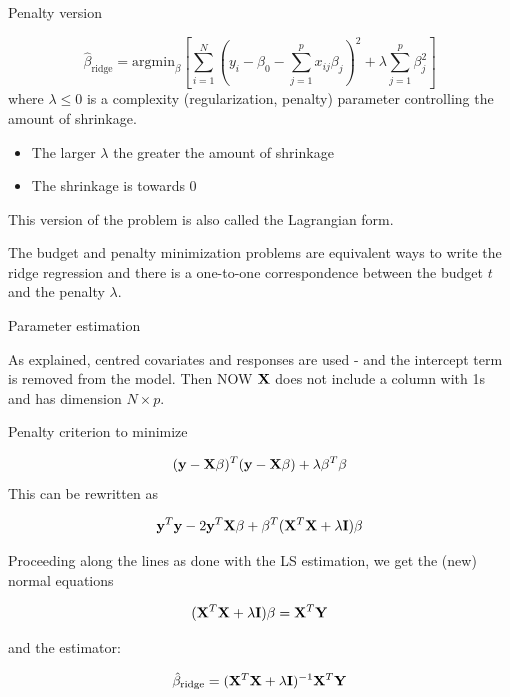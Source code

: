 \documentclass[
  ignorenonframetext,
]{beamer}
\providecommand{\tightlist}{%
  \setlength{\itemsep}{0pt}\setlength{\parskip}{0pt}}
\begin{document}
\begin{frame}

\begin{block}{Penalty version}

\[ \hat{\beta}_{\text{ridge}}= \text{argmin}_{\beta}[\sum_{i=1}^N (y_i-\beta_0-\sum_{j=1}^p x_{ij}\beta_j )^2 + \lambda \sum_{j=1}^p \beta_j^2]\]
where \(\lambda \le 0\) is a complexity (regularization, penalty)
parameter controlling the amount of shrinkage.

\begin{itemize}
\tightlist
\item
  The larger \(\lambda\) the greater the amount of shrinkage
\item
  The shrinkage is towards 0
\end{itemize}

This version of the problem is also called the Lagrangian form.

The budget and penalty minimization problems are equivalent ways to
write the ridge regression and there is a one-to-one correspondence
between the budget \(t\) and the penalty \(\lambda\).

\end{block}

\end{frame}

\begin{frame}

\begin{block}{Parameter estimation}

As explained, centred covariates and responses are used - and the
intercept term is removed from the model. Then NOW \({\bf X}\) does not
include a column with 1s and has dimension \(N \times p\).

Penalty criterion to minimize

\[ ({\bf y}-{\bf X}\beta)^T ({\bf y}-{\bf X}\beta)+ \lambda \beta^T \beta \]
This can be rewritten as

\[ {\bf y}^T{\bf y}-2{\bf y}^T{\bf X}\beta+\beta^T({\bf X}^T{\bf X}+\lambda {\bf I})\beta\]

\end{block}

\end{frame}

\begin{frame}

Proceeding along the lines as done with the LS estimation, we get the
(new) normal equations

\[ ({\bf X}^T{\bf X}+\lambda {\bf I})\beta= {\bf X}^T {\bf Y}\]

and the estimator:

\[ \hat{\beta}_{\text{ridge}}=({\bf X}^T{\bf X}+\lambda {\bf I})^{-1} {\bf X}^T {\bf Y}\]

\end{frame}
\end{document}

